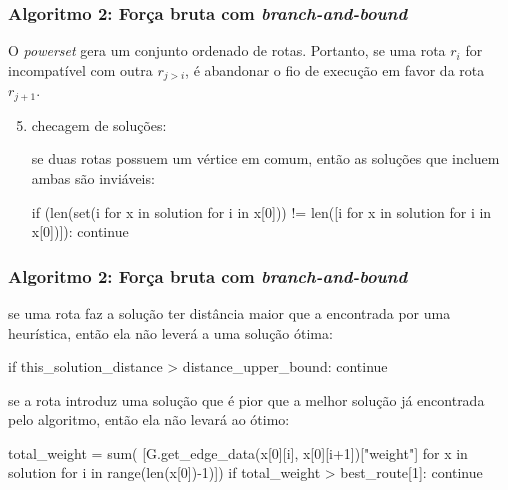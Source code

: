 \documentclass{beamer}
\begin{document}
\begin{frame}[fragile] %
    \frametitle{Algoritmo 2: Força bruta com \emph{branch-and-bound}}

    O \emph{powerset} gera um conjunto ordenado de rotas. Portanto, se uma rota \(r_{i}\) for incompatível com outra \(r_{j > i}\), é abandonar o fio de execução em favor da rota \(r_{j+1}\). 

    \bigskip

    \begin{enumerate}
        \setcounter{enumi}{4}
        \item checagem de soluções:

    \begin{block}{se duas rotas possuem um vértice em comum, então as soluções que incluem ambas são inviáveis:}
    \begin{python}
    if (len(set(i for x in solution for i in x[0]))
        != len([i for x in solution for i in x[0])]):
        continue
    \end{python}
    \end{block}
        
        
    \end{enumerate}

\end{frame}


\begin{frame}[fragile] %
    \frametitle{Algoritmo 2: Força bruta com \emph{branch-and-bound}}

    \begin{block}{se uma rota faz a solução ter distância maior que a encontrada por uma heurística, então ela não leverá a uma solução ótima:}
    \begin{python}
    if this_solution_distance > distance_upper_bound:
        continue
    \end{python}
    \end{block}

    \begin{block}{se a rota introduz uma solução que é pior que a melhor solução já encontrada pelo algoritmo, então ela não levará ao ótimo:}
    \begin{python}
    total_weight = sum(
        [G.get_edge_data(x[0][i], x[0][i+1])["weight"]
         for x in solution for i in range(len(x[0])-1)])
    if total_weight > best_route[1]:
        continue
    \end{python}
    \end{block}

        
\end{frame}
\end{document}
